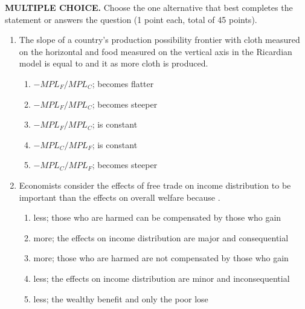 \documentclass[12pt]{article}
\begin{document}
\vspace{1em}

\textbf{MULTIPLE CHOICE.} Choose the one alternative that best completes the statement or answers the question (1 point each, total of 45 points).

\vspace{1em}


\begin{enumerate}[label=\textbf{\arabic*.}]

\item The slope of a country's production possibility frontier with cloth measured on the horizontal and food measured on the vertical axis in the Ricardian model is equal to \underline{\hspace{2em}} and it \underline{\hspace{2em}} as more cloth is produced.
\begin{enumerate}[label=\Alph*.]
\item $-MPL_F/MPL_C$; becomes flatter
\item $-MPL_F/MPL_C$; becomes steeper
\item $-MPL_F/MPL_C$; is constant
\item $-MPL_C/MPL_F$; is constant
\item $-MPL_C/MPL_F$; becomes steeper
\end{enumerate}

\item Economists consider the effects of free trade on income distribution to be \underline{\hspace{2em}} important than the effects on overall welfare because \underline{\hspace{2em}}.
\begin{enumerate}[label=\Alph*.]
\item less; those who are harmed can be compensated by those who gain
\item more; the effects on income distribution are major and consequential
\item more; those who are harmed are not compensated by those who gain
\item less; the effects on income distribution are minor and inconsequential
\item less; the wealthy benefit and only the poor lose
\end{enumerate}


\end{enumerate}
\end{document}
